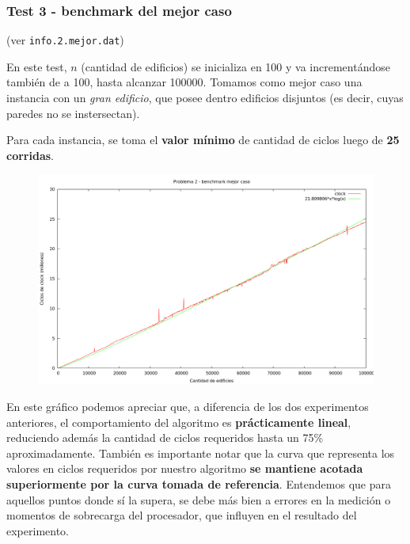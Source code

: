 \newpage


\subsubsection{Test 3 - benchmark del mejor caso}

(ver \verb|info.2.mejor.dat|) \medskip

En este test, $n$ (cantidad de edificios) se inicializa en 100 y va incrementándose también de a 100,
hasta alcanzar 100000. Tomamos como mejor caso una instancia con un \textit{gran edificio}, que posee dentro
edificios disjuntos (es decir, cuyas paredes no se instersectan).

Para cada instancia, se toma el \textbf{valor mínimo} de cantidad de ciclos luego de \textbf{25 corridas}.


\begin{figure}[h]
  \begin{center}
    \includegraphics[scale=0.35]{imagenes/grafico-2-mejor.png}
  \end{center}
\end{figure}


En este gráfico podemos apreciar que, a diferencia de los dos experimentos anteriores, el comportamiento
del algoritmo es \textbf{prácticamente lineal}, reduciendo además la cantidad de ciclos requeridos hasta un 75\%
aproximadamente. También es importante notar que la curva que representa los valores en ciclos requeridos
por nuestro algoritmo \textbf{se mantiene acotada superiormente por la curva tomada de referencia}. Entendemos que
para aquellos puntos donde sí la supera, se debe más bien a errores en la medición o momentos de sobrecarga
del procesador, que influyen en el resultado del experimento.
